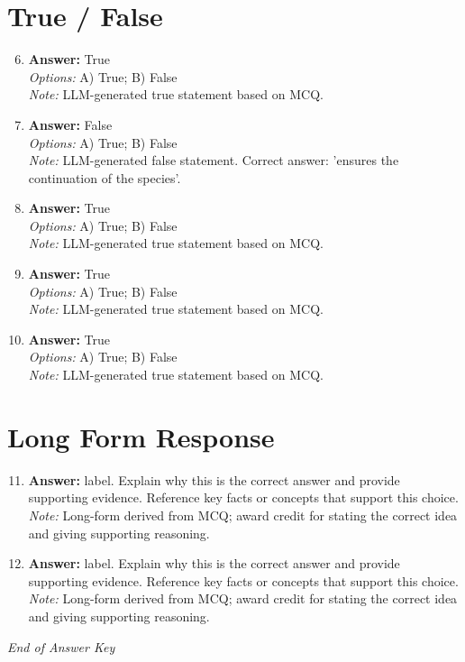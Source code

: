 \documentclass[12pt]{article}
\begin{document}
\section*{True / False}
\begin{enumerate}[label=\arabic*.]
\setcounter{enumi}{5}
\item \textbf{Answer:} True
\\ \textit{Options:} A) True; B) False
\\ \textit{Note:} LLM-generated true statement based on MCQ.
\item \textbf{Answer:} False
\\ \textit{Options:} A) True; B) False
\\ \textit{Note:} LLM-generated false statement. Correct answer: 'ensures the continuation of the species'.
\item \textbf{Answer:} True
\\ \textit{Options:} A) True; B) False
\\ \textit{Note:} LLM-generated true statement based on MCQ.
\item \textbf{Answer:} True
\\ \textit{Options:} A) True; B) False
\\ \textit{Note:} LLM-generated true statement based on MCQ.
\item \textbf{Answer:} True
\\ \textit{Options:} A) True; B) False
\\ \textit{Note:} LLM-generated true statement based on MCQ.
\end{enumerate}

\section*{Long Form Response}
\begin{enumerate}[label=\arabic*.]
\setcounter{enumi}{10}
\item \textbf{Answer:} label. Explain why this is the correct answer and provide supporting evidence. Reference key facts or concepts that support this choice.
\\ \textit{Note:} Long-form derived from MCQ; award credit for stating the correct idea and giving supporting reasoning.
\item \textbf{Answer:} label. Explain why this is the correct answer and provide supporting evidence. Reference key facts or concepts that support this choice.
\\ \textit{Note:} Long-form derived from MCQ; award credit for stating the correct idea and giving supporting reasoning.
\end{enumerate}

\vfill
\noindent\textit{End of Answer Key}
\end{document}
